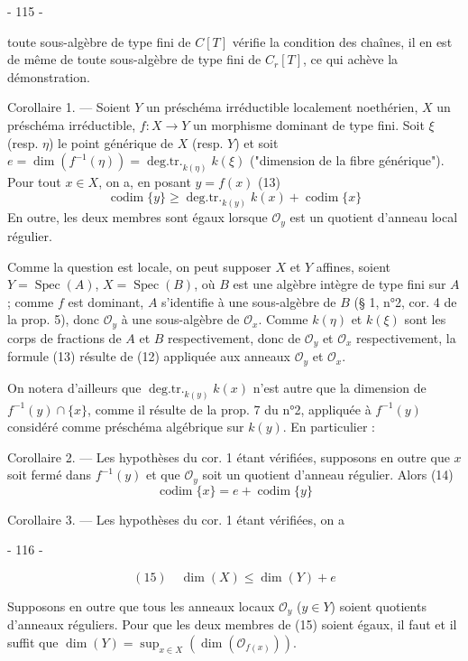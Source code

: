 \newpage


- 115 -

toute sous-algèbre de type fini de $C[T]$ vérifie la condition des chaînes, il en est de même de toute sous-algèbre de type fini de $C_r[T]$, ce qui achève la démonstration.

Corollaire 1. — Soient $Y$ un préschéma irréductible localement noethérien, $X$ un préschéma irréductible, $f : X \to Y$ un morphisme dominant de type fini. Soit $\xi$ (resp. $\eta$) le point générique de $X$ (resp. $Y$) et soit $e = \dim(f^{-1}(\eta)) = \operatorname{deg.tr.}_{k(\eta)} k(\xi)$ ("dimension de la fibre générique"). Pour tout $x \in X$, on a, en posant $y = f(x)$
(13)
$$\operatorname{codim}\{y\} \ge \operatorname{deg.tr.}_{k(y)} k(x) + \operatorname{codim}\{x\}$$
En outre, les deux membres sont égaux lorsque $\mathcal{O}_y$ est un quotient d'anneau local régulier.

Comme la question est locale, on peut supposer $X$ et $Y$ affines, soient $Y = \operatorname{Spec}(A)$, $X = \operatorname{Spec}(B)$, où $B$ est une algèbre intègre de type fini sur $A$; comme $f$ est dominant, $A$ s'identifie à une sous-algèbre de $B$ (§ 1, n°2, cor. 4 de la prop. 5), donc $\mathcal{O}_y$ à une sous-algèbre de $\mathcal{O}_x$. Comme $k(\eta)$ et $k(\xi)$ sont les corps de fractions de $A$ et $B$ respectivement, donc de $\mathcal{O}_y$ et $\mathcal{O}_x$ respectivement, la formule (13) résulte de (12) appliquée aux anneaux $\mathcal{O}_y$ et $\mathcal{O}_x$.

On notera d'ailleurs que $\operatorname{deg.tr.}_{k(y)} k(x)$ n'est autre que la dimension de $f^{-1}(y) \cap \{x\}$, comme il résulte de la prop. 7 du n°2, appliquée à $f^{-1}(y)$ considéré comme préschéma algébrique sur $k(y)$. En particulier :

Corollaire 2. — Les hypothèses du cor. 1 étant vérifiées, supposons en outre que $x$ soit fermé dans $f^{-1}(y)$ et que $\mathcal{O}_y$ soit un quotient d'anneau régulier. Alors
(14)
$$\operatorname{codim}\{x\} = e + \operatorname{codim}\{y\}$$

Corollaire 3. — Les hypothèses du cor. 1 étant vérifiées, on a

\newpage


- 116 -

$$(15) \quad \dim(X) \leqslant \dim(Y) + e$$

Supposons en outre que tous les anneaux locaux $\mathcal{O}_y$ ($y \in Y$) soient quotients d'anneaux réguliers. Pour que les deux membres de (15) soient égaux, il faut et il suffit que $\dim(Y) = \sup_{x \in X} (\dim(\mathcal{O}_{f(x)}))$.

